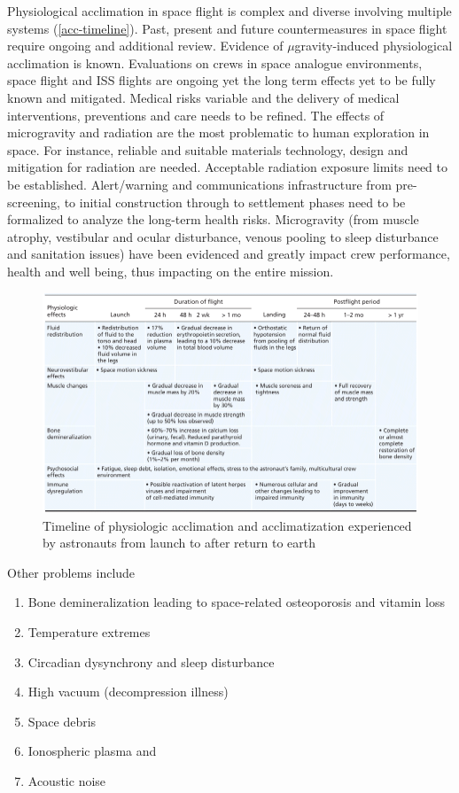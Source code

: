 \documentclass[letter,11pt]{article}
\begin{document}
Physiological acclimation in space flight is complex and diverse involving
multiple systems (\autoref{acc-timeline}). Past, present and future
countermeasures in space flight require ongoing and additional review. Evidence
of $\mu$gravity-induced physiological acclimation is known. Evaluations on
crews in space analogue environments, space flight and \gls{ISS} flights are
ongoing yet the long term effects yet to be fully known and mitigated. Medical
risks variable and the delivery of medical interventions, preventions and care
needs to be refined.  The effects of microgravity and radiation are the most
problematic to human exploration in space. For instance, reliable and suitable
materials technology, design and mitigation for radiation are needed.
Acceptable radiation exposure limits need to be established. Alert/warning and
communications infrastructure from pre-screening, to initial construction
through to settlement phases need to be formalized to analyze the long-term
health risks. Microgravity (from muscle atrophy, vestibular and ocular
disturbance, venous pooling to sleep disturbance and sanitation issues) have
been evidenced and greatly impact crew performance, health and well being, thus
impacting on the entire mission.
 
\begin{figure}[hbt!]
	\centering
	\includegraphics[width=\textwidth]{SJTable3}

\caption{Timeline of physiologic acclimation and acclimatization experienced by astronauts from launch to after return to earth\cite{Williams2009}}
  \label{acc-timeline}
\end{figure}

Other problems include \begin{enumerate} \item Bone demineralization leading to space-related osteoporosis and vitamin loss \item Temperature extremes \item Circadian dysynchrony and sleep disturbance \item High vacuum (decompression illness) \item Space debris \item Ionospheric plasma and \item Acoustic noise \end{enumerate}
\end{document}
